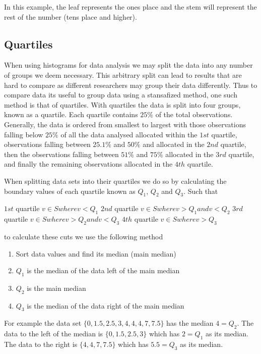 In this example, the leaf represents the ones place and the stem will represent the rest of the number (tens place and higher).

\subsection{Quartiles}
When using histograms for data analysis we may split the data into any number of groups we deem necessary. This arbitrary split can lead to results that are hard to compare as different researchers may group their data differently. Thus to compare data its useful to group data using a stansafized method, one such method is that of quartiles. With quartiles the data is split into four groups, known as a quartile. Each quartile contains $25\%$ of the total observations. Generally, the data is ordered from smallest to largest with those observations falling below $25\%$ of all the data analysed allocated within the $1st$ quartile, observations falling between $25.1\%$ and $50\%$ and allocated in the $2nd$ quartile, then the observations falling between $51\%$ and $75\%$ allocated in the $3rd$ quartile, and finally the remaining observations allocated in the $4th$ quartile.

When splitting data sets into their quartiles we do so by calculating the boundary values of each quartile known as $Q_1$, $Q_2$ and $Q_3$. Such that

$1st$ quartile $v \in S where v < Q_1$
$2nd$ quartile $v \in S where v > Q_1 and v < Q_2$
$3rd$ quartile $v \in S where v > Q_2 and v < Q_3$
$4th$ quartile $v \in S where v > Q_3$

to calculate these cuts we use the following method
\begin{enumerate}
    \item Sort data values and find its median (main median)
    \item $Q_1$ is the median of the data left of the main median
    \item $Q_2$ is the main median
    \item $Q_3$ is the median of the data right of the main median
\end{enumerate}

For example the data set $\{0, 1.5, 2.5, 3, 4, 4, 4, 7, 7.5\}$ has the median $4 = Q_2$. The data to the left of the median is $\{0, 1.5, 2.5, 3\}$ which has $2 = Q_1$ as its median. The data to the right is $\{4, 4, 7, 7.5\}$ which has $5.5 = Q_3$ as its median.

